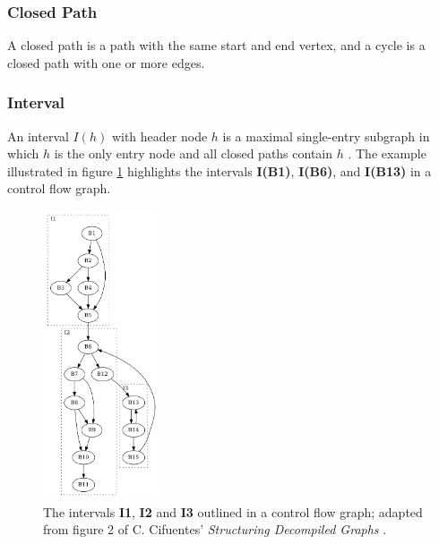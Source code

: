\subsubsection{Closed Path}


A closed path is a path with the same start and end vertex, and a cycle is a closed path with one or more edges.


\subsubsection{Interval}


An interval $I(h)$ with header node $h$ is a maximal single-entry subgraph in which $h$ is the only entry node and all closed paths contain $h$ \cite{structuring_algorithm_for_decompilation}. The example illustrated in figure \ref{fig:interval} highlights the intervals \textbf{I(B1)}, \textbf{I(B6)}, and \textbf{I(B13)} in a control flow graph.

\begin{figure}[htbp]
	\centering
	\includegraphics[width=0.3\textwidth]{inc/appendices/vocabulary/interval.png}
	\caption{The intervals \textbf{I1}, \textbf{I2} and \textbf{I3} outlined in a control flow graph; adapted from figure 2 of C. Cifuentes' \textit{Structuring Decompiled Graphs} \cite{structuring_decompiled_graphs}.}
	\label{fig:interval}
\end{figure}

